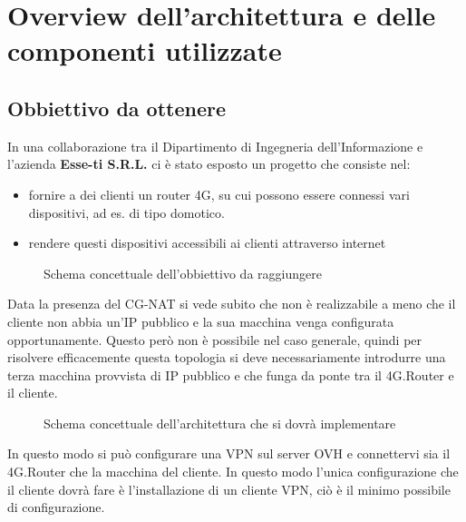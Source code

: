 

\chapter{Overview dell'architettura e delle componenti utilizzate}
\setlength{\parskip}{1em}
\setlength{\parindent}{0em}
\renewcommand{\baselinestretch}{1.15}

\label{ch:1}

\section{Obbiettivo da ottenere}

In una collaborazione tra il Dipartimento di Ingegneria dell'Informazione e l'azienda \textbf{Esse-ti S.R.L.} ci \`e stato esposto un progetto che consiste nel:

\begin{itemize}
	\item fornire a dei clienti un router 4G, su cui possono essere connessi vari dispositivi, ad es. di tipo domotico.
	\item rendere questi dispositivi accessibili ai clienti attraverso internet
\end{itemize}

\begin{figure}[ht]
	\centering
	
	\caption{Schema concettuale dell'obbiettivo da raggiungere}

	\label{fig:schema_concettuale}

\end{figure}

Data la presenza del CG-NAT si vede subito che non \`e realizzabile a meno che il cliente non abbia un'IP pubblico e la sua macchina venga configurata opportunamente. Questo per\`o non \`e possibile nel caso generale, quindi per risolvere efficacemente questa topologia si deve necessariamente introdurre una terza macchina provvista di IP pubblico e che funga da ponte tra il 4G.Router e il cliente.

\begin{figure}[ht]
	\centering
	
	\caption{Schema concettuale dell'architettura che si dovr\`a implementare}

	\label{fig:schem_architettura_reale}

\end{figure}

In questo modo si pu\`o configurare una VPN sul server OVH e connettervi sia il 4G.Router che la macchina del cliente. In questo modo l'unica configurazione che il cliente dovr\`a fare \`e l'installazione di un cliente VPN, ci\`o \`e il minimo possibile di configurazione.

